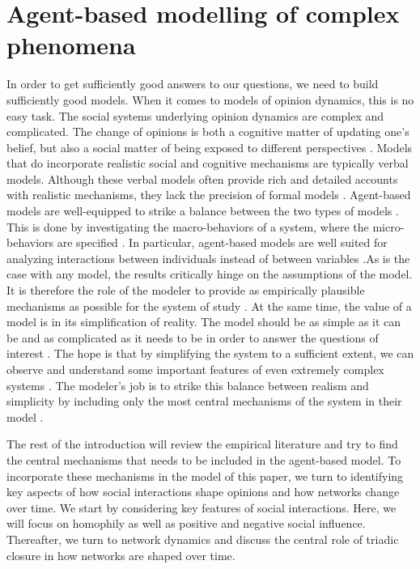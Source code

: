 \documentclass{article}
\begin{document}
\section{Agent-based modelling of complex phenomena}
In order to get sufficiently good answers to our questions, we need to build sufficiently good models. 
When it comes to models of opinion dynamics, this is no easy task. 
The social systems underlying opinion dynamics are complex and complicated. 
The change of opinions is both a cognitive matter of updating one’s belief, but also a social matter of being exposed to different perspectives \cite{flache_models_2017,friedkin_social_1990,spears_social_2021}. 
Models that do incorporate realistic social and cognitive mechanisms are typically verbal models. 
Although these verbal models often provide rich and detailed accounts with realistic mechanisms, they lack the precision of formal models \cite{fogarty_ten_2022,galesic_integrating_2021,smaldino_how_2020}. 
Agent-based models are well-equipped to strike a balance between the two types of models \cite{flache_between_2018,galesic_integrating_2021,epstein1999agent,mas2014cultural}. This is done by investigating the macro-behaviors of a system, where the micro-behaviors are specified \cite{bruch_agent-based_2015,epstein1999agent,flache_between_2018}. In particular, agent-based models are well suited for analyzing interactions between individuals instead of between variables \cite{geschke2019triple}.As is the case with any model, the results critically hinge on the assumptions of the model. It is therefore the role of the modeler to provide as empirically plausible mechanisms as possible for the system of study \cite{crooks2012introduction,epstein1999agent,page2010diversity}. At the same time, the value of a model is in its simplification of reality. The model should be as simple as it can be and as complicated as it needs to be in order to answer the questions of interest \cite{smaldino_how_2020}. The hope is that by simplifying the system to a sufficient extent, we can observe and understand some important features of even extremely complex systems \cite{fogarty_ten_2022,smaldino_how_2020}. The modeler’s job is to strike this balance between realism and simplicity by including only the most central mechanisms of the system in their model \cite{smaldino_models_2016}. 

The rest of the introduction will review the empirical literature and try to find the central mechanisms that needs to be included in the agent-based model. To incorporate these mechanisms in the model of this paper, we turn to identifying key aspects of how social interactions shape opinions and how networks change over time. We start by considering key features of social interactions. Here, we will focus on homophily as well as positive and negative social influence. Thereafter, we turn to network dynamics and discuss the central role of triadic closure in how networks are shaped over time.
\end{document}
